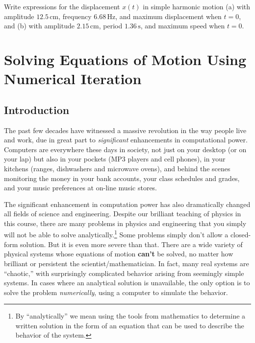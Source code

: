 \begin{exercise}
Write expressions for the displacement $x(t)$ in simple harmonic
motion (a) with amplitude $12.5\,\text{cm}$, frequency $6.68\,\text{Hz}$, 
and maximum displacement when
$t = 0$, and (b) with amplitude $2.15\,\text{cm}$, period $1.36\,\text{s}$, 
and maximum speed when $t = 0$.
\label{prob:SHO}
\end{exercise} 


\chapter{Solving Equations of Motion Using 
Numerical Iteration}
\label{chap:numerical}


\section{Introduction}

The past few decades have witnessed a massive revolution in the way
people live and work, due in great part to \emph{significant} enhancements
in computational power.  Computers are everywhere these days in society,
not just on your desktop (or on your lap) but also in your pockets
(MP3 players and cell phones), in your kitchens (ranges, dishwashers
and microwave ovens), and behind the scenes monitoring the money in
your bank accounts, your class schedules and grades, and your music
preferences at on-line music stores.  

The significant enhancement in
computation power has also dramatically changed all fields of science
and engineering.  Despite our brilliant teaching of physics
in this course, there are many problems in physics and engineering that
you simply will not be able to solve analytically.\footnote{By ``analytically''
we mean using the tools from mathematics to determine a written solution
in the form of an equation that can be used to describe the behavior of the
system.}  Some problems simply don't allow a closed-form solution.
But it is even more severe than that.  There are a wide variety of
physical systems whose equations of motion \textbf{can't} be solved, 
no matter how brilliant or persistent the 
scientist/mathematician.  In fact, many real systems are ``chaotic,''
with surprisingly complicated behavior arising from seemingly simple
systems.  In cases where an analytical solution is unavailable, the 
only option is to solve the problem \emph{numerically}, using a 
computer to simulate the behavior.

